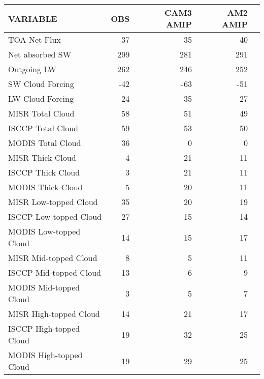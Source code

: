 \begin{tabular}{lrrrr}
\hline
                VARIABLE &                      OBS &                CAM3 AMIP &                 AM2 AMIP \\ \hline
            TOA Net Flux &                       37 &                       35 &                       40 \\
         Net absorbed SW &                      299 &                      281 &                      291 \\
             Outgoing LW &                      262 &                      246 &                      252 \\
        SW Cloud Forcing &                      -42 &                      -63 &                      -51 \\
        LW Cloud Forcing &                       24 &                       35 &                       27 \\
        MISR Total Cloud &                       58 &                       51 &                       49 \\
       ISCCP Total Cloud &                       59 &                       53 &                       50 \\
       MODIS Total Cloud &                       36 &                        0 &                        0 \\
        MISR Thick Cloud &                        4 &                       21 &                       11 \\
       ISCCP Thick Cloud &                        3 &                       21 &                       11 \\
       MODIS Thick Cloud &                        5 &                       20 &                       11 \\
   MISR Low-topped Cloud &                       35 &                       20 &                       19 \\
  ISCCP Low-topped Cloud &                       27 &                       15 &                       14 \\
  MODIS Low-topped Cloud &                       14 &                       15 &                       17 \\
   MISR Mid-topped Cloud &                        8 &                        5 &                       11 \\
  ISCCP Mid-topped Cloud &                       13 &                        6 &                        9 \\
  MODIS Mid-topped Cloud &                        3 &                        5 &                        7 \\
  MISR High-topped Cloud &                       14 &                       21 &                       17 \\
 ISCCP High-topped Cloud &                       19 &                       32 &                       25 \\
 MODIS High-topped Cloud &                       19 &                       29 &                       25 \\ \hline
\end{tabular}
